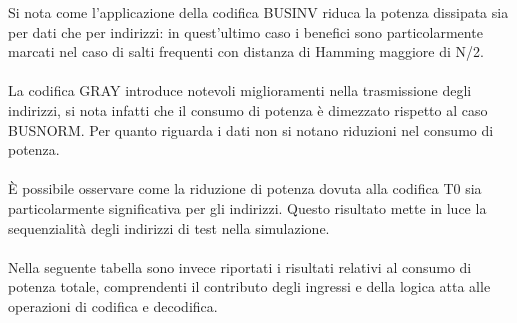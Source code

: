 \documentclass[11pt,  english, makeidx, a4paper, titlepage, oneside]{book}
\begin{document}
Si nota come l'applicazione della codifica BUSINV riduca la potenza dissipata sia per dati che per indirizzi: in quest'ultimo caso i benefici sono particolarmente marcati nel caso di salti frequenti con distanza di Hamming maggiore di N/2.
\\\\
La codifica GRAY introduce notevoli miglioramenti nella trasmissione degli indirizzi, si nota infatti che il consumo di potenza è dimezzato rispetto al caso BUSNORM. Per quanto riguarda i dati non si notano riduzioni nel consumo di potenza.
\\\\
È possibile osservare come la riduzione di potenza dovuta alla codifica T0 sia particolarmente significativa per gli indirizzi. Questo risultato mette in luce la sequenzialità degli indirizzi di test nella simulazione.
\\\\
Nella seguente tabella sono invece riportati i risultati relativi al consumo di potenza totale, comprendenti il contributo degli ingressi e della logica atta alle operazioni di codifica e decodifica.
\end{document}
